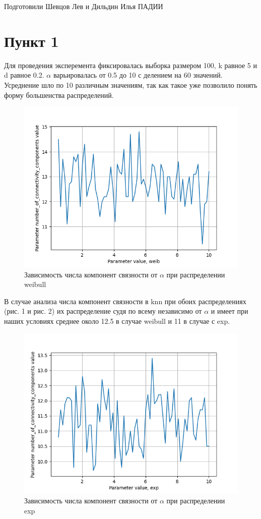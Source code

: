\documentclass{HSEtitle}
\begin{document}
Подготовили Шевцов Лев и Дильдин Илья ПАДИИ

\section{Пункт 1}

Для проведения эксперемента фиксировалась выборка размером 100, k равное 5 и d равное 0.2. $\alpha$ варьировалась от 0.5 до 10 с делением на 60 значений. Усреднение шло по 10 различным значениям, так как такое уже позволило понять форму большенства распределений. 


\begin{figure}[hb]
    \centering
    \includegraphics[width=0.65\linewidth]{weib_alpha_knn.png}
    \caption{Зависимость числа компонент связности от $\alpha$ при распределении weibull}
    \label{fig:enter-label}
\end{figure}

В случае анализа числа компонент связности в knn при обоих распределениях (рис. 1 и рис. 2) их распределение судя по всему независимо от $\alpha$ и имеет при наших условиях среднее около 12.5 в случае weibull и 11 в случае с exp.

\pagebreak

\begin{figure}[h]
    \centering
    \includegraphics[width=0.65\linewidth]{exp_alpha_knn.png}
    \caption{Зависимость числа компонент связности от $\alpha$ при распределении exp}
    \label{fig:enter-label}
\end{figure}
\end{document}
